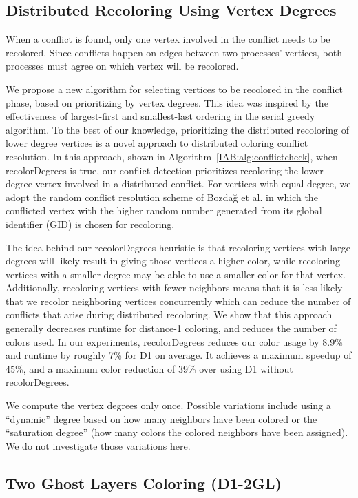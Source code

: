 \subsection{Distributed Recoloring Using Vertex Degrees}

When a conflict is found, only one vertex involved in the conflict needs to be recolored. 
Since conflicts happen on edges between two processes' vertices, both processes must agree on which vertex will be recolored.

We propose a new algorithm for selecting vertices to be recolored in the conflict phase, based on prioritizing by vertex degrees. 
This idea was inspired by the effectiveness of largest-first and smallest-last ordering in the serial greedy algorithm. 
To the best of our knowledge, prioritizing the distributed recoloring of lower degree vertices is a novel approach to distributed coloring conflict resolution.
In this approach, 
shown in Algorithm~\ref{IAB:alg:conflictcheck}, when recolorDegrees is true, our conflict detection prioritizes recoloring the lower degree vertex involved in a distributed conflict.
For vertices with equal degree, we adopt the random conflict resolution scheme of Bozda{\u{g}} et al. 
in which 
the conflicted vertex with the higher random number generated from its global identifier (GID) is chosen for recoloring.

The idea behind our recolorDegrees heuristic is that recoloring vertices with large degrees will likely result in giving those vertices a higher color, while recoloring vertices with a smaller degree may be able to use a smaller color for that vertex. 
Additionally, recoloring vertices with fewer neighbors means that it is less likely that we recolor neighboring vertices concurrently which can reduce the number of conflicts that arise during distributed recoloring.
We show that this approach generally decreases runtime for distance-1 coloring, and reduces the number of colors used.
In our experiments, recolorDegrees reduces our color usage by 8.9\% and runtime by roughly 7\% for D1 on average. 
It achieves a maximum speedup of 45\%, and a maximum color reduction of 39\% over using D1 without recolorDegrees.

We compute the vertex degrees only once. Possible variations include using a ``dynamic'' 
degree based on how many neighbors have been colored or the ``saturation degree'' (how many colors the colored neighbors have been assigned). We do not investigate those variations here.

\subsection{Two Ghost Layers Coloring (D1-2GL)}

